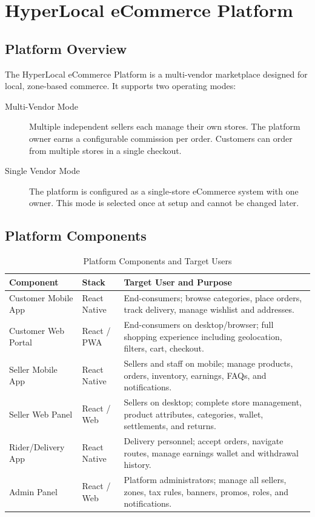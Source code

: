 \documentclass[12pt, a4paper, oneside]{report}
\begin{document}
\chapter{HyperLocal eCommerce Platform}

\section{Platform Overview}

The HyperLocal eCommerce Platform is a multi-vendor marketplace designed for
local, zone-based commerce. It supports two operating modes:

\begin{description}
  \item[Multi-Vendor Mode]
    Multiple independent sellers each manage their own stores. The platform
    owner earns a configurable commission per order. Customers can order from
    multiple stores in a single checkout.
  \item[Single Vendor Mode]
    The platform is configured as a single-store eCommerce system with one
    owner. This mode is selected once at setup and cannot be changed later.
\end{description}

\section{Platform Components}

\begin{table}[H]
\centering
\caption{Platform Components and Target Users}
\label{tab:platform-components}
\begin{tabularx}{\textwidth}{@{} L{3.2cm} L{2.5cm} X @{}}
\toprule
\textbf{Component} & \textbf{Stack} & \textbf{Target User and Purpose} \\
\midrule
Customer Mobile App & React Native & End-consumers; browse categories, place orders,
  track delivery, manage wishlist and addresses. \\[4pt]
Customer Web Portal & React / PWA  & End-consumers on desktop/browser; full shopping
  experience including geolocation, filters, cart, checkout. \\[4pt]
Seller Mobile App   & React Native & Sellers and staff on mobile; manage products,
  orders, inventory, earnings, FAQs, and notifications. \\[4pt]
Seller Web Panel    & React / Web  & Sellers on desktop; complete store management,
  product attributes, categories, wallet, settlements, and returns. \\[4pt]
Rider/Delivery App  & React Native & Delivery personnel; accept orders, navigate
  routes, manage earnings wallet and withdrawal history. \\[4pt]
Admin Panel         & React / Web  & Platform administrators; manage all sellers,
  zones, tax rules, banners, promos, roles, and notifications. \\
\bottomrule
\end{tabularx}
\end{table}
\end{document}
